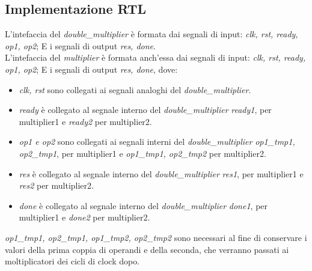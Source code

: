 \documentclass[]{IEEEtran}
\begin{document}
\subsection{Implementazione RTL}
L'intefaccia del \textit{double\_multiplier} è formata dai segnali di input: \textit{clk, rst, ready, op1, op2}; E i segnali di output \textit{res, done}. \\
L'intefaccia del \textit{multiplier} è formata anch'essa dai segnali di input: \textit{clk, rst, ready, op1, op2}; E i segnali di output \textit{res, done}, dove:
\begin{itemize}
    \item \textit{clk, rst} sono collegati ai segnali analoghi del \textit{double\_multiplier}.
    \item \textit{ready} è collegato al segnale interno del \textit{double\_multiplier} \textit{ready1}, per multiplier1 e \textit{ready2} per multiplier2.
    \item \textit{op1 e op2} sono collegati ai segnali interni del \textit{double\_multiplier} \textit{op1\_tmp1, op2\_tmp1}, per multiplier1 e \textit{op1\_tmp1, op2\_tmp2} per multiplier2.
    \item \textit{res} è collegato al segnale interno del \textit{double\_multiplier} \textit{res1}, per multiplier1 e \textit{res2} per multiplier2.
    \item \textit{done} è collegato al segnale interno del \textit{double\_multiplier} \textit{done1}, per multiplier1 e \textit{done2} per multiplier2.
\end{itemize}
\textit{op1\_tmp1, op2\_tmp1, op1\_tmp2, op2\_tmp2} sono necessari al fine di conservare i valori della prima coppia di operandi e della seconda, che verranno passati ai moltiplicatori dei cicli di clock dopo.
\end{document}
